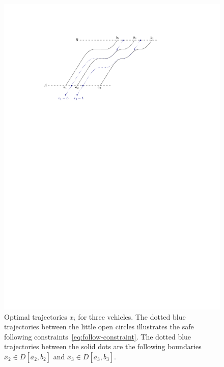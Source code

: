 \documentclass[a4paper]{report}
\theoremstyle{definition}
\theoremstyle{plain}
\begin{document}
\begin{figure}
  \centering
  \includegraphics[scale=1.0]{figures/motion/solution}
  \caption{Optimal trajectories $x_{i}$ for three vehicles. The dotted blue
    trajectories between the little open circles illustrates the safe following
    constraints~\eqref{eq:follow-constraint}. The dotted blue trajectories between
    the solid dots are the following boundaries
    $\bar{x}_{2} \in \bar{D}[\bar{a}_{2}, \bar{b}_{2}]$ and
    $\bar{x}_{3} \in \bar{D}[\bar{a}_{3}, \bar{b}_{3}]$.}%
  \label{fig:solution}
\end{figure}
\end{document}
